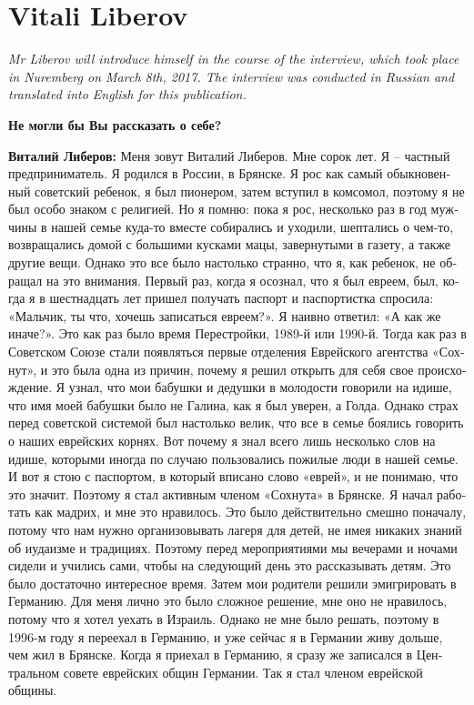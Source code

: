 \section{Vitali Liberov}

\textit{Mr Liberov will introduce himself in the course of the interview, which took place in Nuremberg on March 8th, 2017. The interview was conducted in Russian and translated into English for this publication.}\par
\vspace*{2em}
\begin{otherlanguage}{russian}
	\textbf{Не могли бы Вы рассказать о себе?} 
	
	\textbf{Виталий Либеров:} Меня зовут Виталий Либеров. Мне сорок лет. Я – частный предприниматель. Я родился в России, в Брянске. Я рос как самый обыкновенный советский ребенок, я был пионером, затем вступил в комсомол, поэтому я не был особо знаком с религией. Но я помню: пока я рос, несколько раз в год мужчины в нашей семье куда-то вместе собирались и уходили, шептались о чем-то, возвращались домой с большими кусками мацы, завернутыми в газету, а также другие вещи. Однако это все было настолько странно, что я, как ребенок, не обращал на это внимания. Первый раз, когда я осознал, что я был евреем, был, когда я в шестнадцать лет пришел получать паспорт и паспортистка спросила: «Мальчик, ты что, хочешь записаться евреем?». Я наивно ответил: «А как же иначе?». Это как раз было время Перестройки, 1989-й или 1990-й. Тогда как раз в Советском Союзе стали появляться первые отделения Еврейского агентства «Сохнут», и это была одна из причин, почему я решил открыть для себя свое происхождение. Я узнал, что мои бабушки и дедушки в молодости говорили на идише, что имя моей бабушки было не Галина, как я был уверен, а Голда. Однако страх перед советской системой был настолько велик, что все в семье боялись говорить о наших еврейских корнях. Вот почему я знал всего лишь несколько слов на идише, которыми иногда по случаю пользовались пожилые люди в нашей семье. И вот я стою с паспортом, в который вписано слово «еврей», и не понимаю, что это значит. Поэтому я стал активным членом «Сохнута» в Брянске. Я начал работать как мадрих, и мне это нравилось. Это было действительно смешно поначалу, потому что нам нужно организовывать лагеря для детей, не имея никаких знаний об иудаизме и традициях. Поэтому перед мероприятиями мы вечерами и ночами сидели и учились сами, чтобы на следующий день это рассказывать детям. Это было достаточно интересное время. Затем мои родители решили эмигрировать в Германию. Для меня лично это было сложное решение, мне оно не нравилось, потому что я хотел уехать в Израиль. Однако не мне было решать, поэтому в 1996-м году я переехал в Германию, и уже сейчас я в Германии живу дольше, чем жил в Брянске. Когда я приехал в Германию, я сразу же записался в Центральном совете еврейских общин Германии. Так я стал членом еврейской общины. 
	

\end{otherlanguage}
